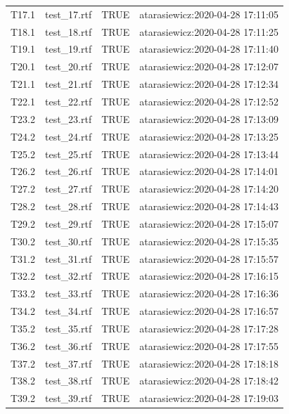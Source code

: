\documentclass[]{article}
\begin{document}
\begin{longtable}{llll}
T17.1 & test\_17.rtf & TRUE & atarasiewicz:2020-04-28 17:11:05\\
\addlinespace
\rowcolor{gray!6}  T18.1 & test\_18.rtf & TRUE & atarasiewicz:2020-04-28 17:11:25\\
T19.1 & test\_19.rtf & TRUE & atarasiewicz:2020-04-28 17:11:40\\
\rowcolor{gray!6}  T20.1 & test\_20.rtf & TRUE & atarasiewicz:2020-04-28 17:12:07\\
T21.1 & test\_21.rtf & TRUE & atarasiewicz:2020-04-28 17:12:34\\
\rowcolor{gray!6}  T22.1 & test\_22.rtf & TRUE & atarasiewicz:2020-04-28 17:12:52\\
\addlinespace
T23.2 & test\_23.rtf & TRUE & atarasiewicz:2020-04-28 17:13:09\\
\rowcolor{gray!6}  T24.2 & test\_24.rtf & TRUE & atarasiewicz:2020-04-28 17:13:25\\
T25.2 & test\_25.rtf & TRUE & atarasiewicz:2020-04-28 17:13:44\\
\rowcolor{gray!6}  T26.2 & test\_26.rtf & TRUE & atarasiewicz:2020-04-28 17:14:01\\
T27.2 & test\_27.rtf & TRUE & atarasiewicz:2020-04-28 17:14:20\\
\addlinespace
\rowcolor{gray!6}  T28.2 & test\_28.rtf & TRUE & atarasiewicz:2020-04-28 17:14:43\\
T29.2 & test\_29.rtf & TRUE & atarasiewicz:2020-04-28 17:15:07\\
\rowcolor{gray!6}  T30.2 & test\_30.rtf & TRUE & atarasiewicz:2020-04-28 17:15:35\\
T31.2 & test\_31.rtf & TRUE & atarasiewicz:2020-04-28 17:15:57\\
\rowcolor{gray!6}  T32.2 & test\_32.rtf & TRUE & atarasiewicz:2020-04-28 17:16:15\\
\addlinespace
T33.2 & test\_33.rtf & TRUE & atarasiewicz:2020-04-28 17:16:36\\
\rowcolor{gray!6}  T34.2 & test\_34.rtf & TRUE & atarasiewicz:2020-04-28 17:16:57\\
T35.2 & test\_35.rtf & TRUE & atarasiewicz:2020-04-28 17:17:28\\
\rowcolor{gray!6}  T36.2 & test\_36.rtf & TRUE & atarasiewicz:2020-04-28 17:17:55\\
T37.2 & test\_37.rtf & TRUE & atarasiewicz:2020-04-28 17:18:18\\
\addlinespace
\rowcolor{gray!6}  T38.2 & test\_38.rtf & TRUE & atarasiewicz:2020-04-28 17:18:42\\
T39.2 & test\_39.rtf & TRUE & atarasiewicz:2020-04-28 17:19:03\\

\end{longtable}
\end{document}
